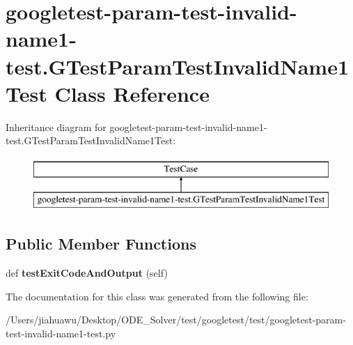 \hypertarget{classgoogletest-param-test-invalid-name1-test_1_1_g_test_param_test_invalid_name1_test}{}\section{googletest-\/param-\/test-\/invalid-\/name1-\/test.G\+Test\+Param\+Test\+Invalid\+Name1\+Test Class Reference}
\label{classgoogletest-param-test-invalid-name1-test_1_1_g_test_param_test_invalid_name1_test}
Inheritance diagram for googletest-\/param-\/test-\/invalid-\/name1-\/test.G\+Test\+Param\+Test\+Invalid\+Name1\+Test\+:\begin{figure}[H]
\begin{center}
\leavevmode
\includegraphics[height=2.000000cm]{classgoogletest-param-test-invalid-name1-test_1_1_g_test_param_test_invalid_name1_test}
\end{center}
\end{figure}
\subsection*{Public Member Functions}
\begin{DoxyCompactItemize}
\item 
\mbox{\label{classgoogletest-param-test-invalid-name1-test_1_1_g_test_param_test_invalid_name1_test_a2b7024a50e0b3b0fe9b0c6d28e470681}} 
def {\bfseries test\+Exit\+Code\+And\+Output} (self)
\end{DoxyCompactItemize}


The documentation for this class was generated from the following file\+:\begin{DoxyCompactItemize}
\item 
/\+Users/jiahuawu/\+Desktop/\+O\+D\+E\+\_\+\+Solver/test/googletest/test/googletest-\/param-\/test-\/invalid-\/name1-\/test.\+py\end{DoxyCompactItemize}
